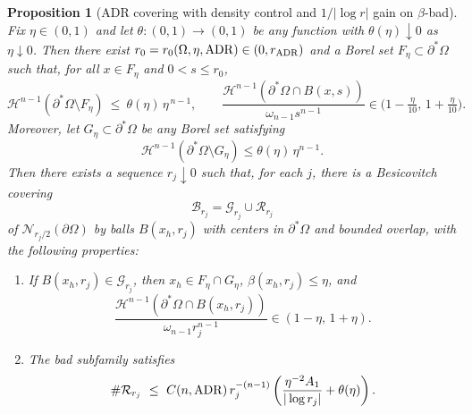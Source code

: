 \documentclass[reqno,11pt]{amsart}
\makeatletter
\newcommand{\Ncal}{\mathcal{N}}
\newtheorem{prop}[thm]{Proposition}%
\numberwithin{equation}{section}
\theoremstyle{remark}
\makeatother
\begin{document}
\begin{prop}[ADR covering with density control and $1/|\log r|$ gain on $\beta$-bad]\label{prop:ADR}
Fix $\eta\in(0,1)$ and let $\theta:(0,1)\to(0,1)$ be any function with $\theta(\eta)\downarrow 0$ as $\eta\downarrow 0$.
Then there exist $r_0=r_0(\Omega,\eta,{\rm ADR})\in(0,r_{\rm ADR})$ and a Borel set $F_\eta\subset\partial^*\Omega$ such that, for all $x \in F_\eta$ and $0<s\leq r_0$,
\begin{equation}\label{eq:Egorov}
  \mathscr H^{n-1}(\partial^*\Omega\setminus F_\eta)\ \le\ \theta(\eta)\,\eta^{\,n-1},\qquad
  \frac{\mathscr H^{n-1}(\partial^*\Omega\cap B(x,s))}{\omega_{n-1}s^{n-1}}\in\Big(1-\tfrac{\eta}{10},\,1+\tfrac{\eta}{10}\Big).
\end{equation}
{Moreover, let $G_\eta\subset\partial^*\Omega$ be any Borel set satisfying}
\[
{
\mathscr H^{n-1}(\partial^*\Omega\setminus G_\eta)\le \theta(\eta)\,\eta^{n-1}.
}
\]
{Then there exists a sequence $r_j\downarrow0$ such that, for each $j$, there is a Besicovitch covering}
\[
{
\mathcal B_{r_j}=\mathcal G_{r_j}\cup\mathcal R_{r_j}
}
\]
{of $\Ncal_{r_j/2}(\partial\Omega)$ by balls $B(x_h,r_j)$ with centers in $\partial^*\Omega$ and bounded overlap, with the following properties:}

\begin{enumerate}
\item\label{item:gooddensity}
{If $B(x_h,r_j)\in\mathcal G_{r_j}$, then $x_h\in F_\eta\cap G_\eta$, $\beta(x_h,r_j)\le\eta$, and}
\[
{
  \frac{\mathscr H^{n-1}(\partial^*\Omega\cap B(x_h,r_j))}{\omega_{n-1}r_j^{n-1}}\in(1-\eta,\,1+\eta).
}
\]

\item\label{item:badcount}
{The bad subfamily satisfies}
\[
{
  \#\mathcal R_{r_j}\ \le\ C(n,{\rm ADR})\,r_j^{-(n-1)}
  \left(\frac{\eta^{-2}A_1}{|\log r_j|}+\theta(\eta)\right).
}
\]
\end{enumerate}
\end{prop}
\end{document}
